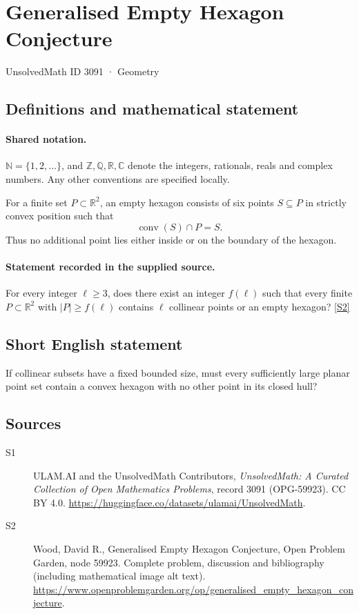 \documentclass[11pt]{book}
\newcommand{\sref}[2]{\hyperlink{source:#1:#2}{[S#2]}}
\begin{document}
\setcounter{section}{3090}
\section{Generalised Empty Hexagon Conjecture}\label{3091}
{\small\sffamily UnsolvedMath ID 3091 · Geometry}
\subsection{Definitions and mathematical statement}

\paragraph{Shared notation.}$\mathbb N=\{1,2,\ldots\}$, and $\mathbb Z,\mathbb Q,\mathbb R,\mathbb C$ denote the integers, rationals, reals and complex numbers. Any other conventions are specified locally.


For a finite set $P\subset\mathbb R^2$, an empty hexagon consists of six points $S\subseteq P$ in strictly convex position such that
\[\operatorname{conv}(S)\cap P=S.\]
Thus no additional point lies either inside or on the boundary of the hexagon.
\paragraph{Statement recorded in the supplied source.}
For every integer $\ell\geq3$, does there exist an integer $f(\ell)$ such that every finite $P\subset\mathbb R^2$ with $|P|\geq f(\ell)$ contains $\ell$ collinear points or an empty hexagon? \sref{3091}{2}
\subsection{Short English statement}
If collinear subsets have a fixed bounded size, must every sufficiently large planar point set contain a convex hexagon with no other point in its closed hull?
\subsection{Sources}
\begin{description}
\item[\hypertarget{source:3091:1}{S1}] ULAM.AI and the UnsolvedMath Contributors, \emph{UnsolvedMath: A Curated Collection of Open Mathematics Problems}, record 3091 (OPG-59923). CC BY 4.0. \url{https://huggingface.co/datasets/ulamai/UnsolvedMath}.
\item[\hypertarget{source:3091:2}{S2}] Wood, David R., Generalised Empty Hexagon Conjecture, Open Problem Garden, node 59923. Complete problem, discussion and bibliography (including mathematical image alt text). \url{https://www.openproblemgarden.org/op/generalised_empty_hexagon_conjecture}.
\end{description}
\label{end:3091}
\end{document}
